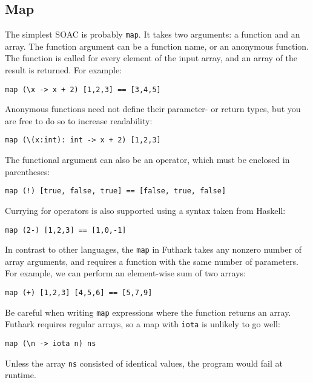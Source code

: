 \documentclass[oneside,11pt]{book}
\begin{document}
\subsection{Map}

The simplest SOAC is probably \texttt{map}.  It takes two arguments: a
function and an array.  The function argument can be a function name,
or an anonymous function.  The function is
called for every element of the input array, and an array of the result is
returned.  For example:

\begin{lstlisting}
map (\x -> x + 2) [1,2,3] == [3,4,5]
\end{lstlisting}

Anonymous functions need not define their parameter- or return types,
but you are free to do so to increase readability:

\begin{lstlisting}
map (\(x:int): int -> x + 2) [1,2,3]
\end{lstlisting}

The functional argument can also be an operator, which must be
enclosed in parentheses:

\begin{lstlisting}
map (!) [true, false, true] == [false, true, false]
\end{lstlisting}

Currying for operators is also supported using a syntax taken from
Haskell:

\begin{lstlisting}
map (2-) [1,2,3] == [1,0,-1]
\end{lstlisting}

In contrast to other languages, the \texttt{map} in Futhark takes any
nonzero number of array arguments, and requires a function with the
same number of parameters.  For example, we can perform an
element-wise sum of two arrays:

\begin{lstlisting}
map (+) [1,2,3] [4,5,6] == [5,7,9]
\end{lstlisting}

Be careful when writing \texttt{map} expressions where the function
returns an array.  Futhark requires regular arrays, so a map with
\texttt{iota} is unlikely to go well:

\begin{lstlisting}
map (\n -> iota n) ns
\end{lstlisting}

Unless the array \texttt{ns} consisted of identical values, the
program would fail at runtime.
\end{document}
